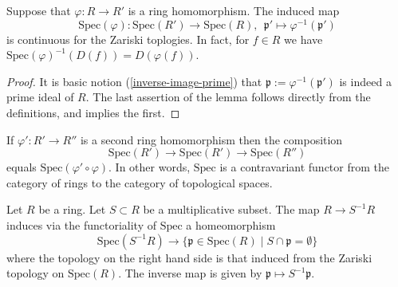\begin{lemma}
\label{lemma-spec-functorial}
Suppose that $\varphi : R \to R'$ is a ring homomorphism.
The induced map
$$
\text{Spec}(\varphi) :
\text{Spec}(R')
\longrightarrow
\text{Spec}(R),\ \ 
\mathfrak p'
\longmapsto
\varphi^{-1}(\mathfrak p')
$$
is continuous for the Zariski toplogies. In fact, for
$f \in R$ we have
$\text{Spec}(\varphi)^{-1}(D(f)) = D(\varphi(f))$.
\end{lemma}

\begin{proof}
It is basic notion (\ref{inverse-image-prime}) that
$\mathfrak p := \varphi^{-1}(\mathfrak p')$
is indeed a prime ideal of $R$. The last assertion
of the lemma follows directly from the definitions,
and implies the first.
\end{proof}

\noindent
If $\varphi' : R' \to R''$ is a second ring homomorphism
then the composition
$$
\text{Spec}(R')
\longrightarrow
\text{Spec}(R')
\longrightarrow
\text{Spec}(R'')
$$
equals $\text{Spec}(\varphi' \circ \varphi)$. In other
words, $\text{Spec}$ is a contravariant functor from the
category of rings to the category of topological spaces.


\begin{lemma}
\label{lemma-spec-localization}
Let $R$ be a ring. Let $S \subset R$ be a multiplicative subset.
The map $R \to S^{-1}R$ induces via the functoriality of $\text{Spec}$
a homeomorphism 
$$
\text{Spec}(S^{-1}R)
\longrightarrow 
\{\mathfrak p \in \text{Spec}(R) \mid S \cap \mathfrak p = \emptyset \}
$$
where the topology on the right hand side is that induced from the
Zariski topology on $\text{Spec}(R)$. The inverse map is given
by $\mathfrak p \mapsto S^{-1}\mathfrak p$.
\end{lemma}

